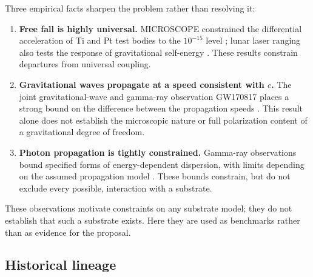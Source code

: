 \documentclass[11pt,a4paper]{article}
\begin{document}
Three empirical facts sharpen the problem rather than resolving it:
\begin{enumerate}
\item \textbf{Free fall is highly universal.} MICROSCOPE constrained the differential
acceleration of Ti and Pt test bodies to the $10^{-15}$ level
\cite{Touboul2022}; lunar laser ranging also tests the response of gravitational self-energy
\cite{Williams2004}. These results constrain departures from universal coupling.
\item \textbf{Gravitational waves propagate at a speed consistent with $c$.} The joint
gravitational-wave and gamma-ray observation GW170817 places a strong bound on the difference
between the propagation speeds \cite{GW170817}. This result alone does not establish the
microscopic nature or full polarization content of a gravitational degree of freedom.
\item \textbf{Photon propagation is tightly constrained.} Gamma-ray observations bound specified
forms of energy-dependent dispersion, with limits depending on the assumed propagation model
\cite{Abdo2009,Vasileiou2013}. These bounds constrain, but do not exclude every possible,
interaction with a substrate.
\end{enumerate}
These observations motivate constraints on any substrate model; they do not establish that such a
substrate exists. Here they are used as benchmarks rather than as evidence for the proposal.

\subsection{Historical lineage}
\end{document}
